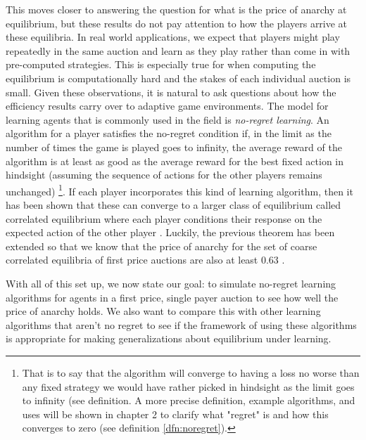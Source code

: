 \documentclass[12pt,twoside]{reedthesis}
\begin{document}
This moves closer to answering the question for what is the price of anarchy at equilibrium, but these results do not pay attention to how the players arrive at these equilibria. In real world applications, we expect that players might play repeatedly in the same auction and learn as they play rather than come in with pre-computed strategies. This is especially true for when computing the equilibrium is computationally hard and the stakes of each individual auction is small. Given these observations, it is natural to ask questions about how the efficiency results carry over to adaptive game environments. The model for learning agents that is commonly used in the field is {\em no-regret learning}. An algorithm for a player satisfies the no-regret condition if, in the limit as the number of times the game is played goes to infinity, the average reward of the algorithm is at least as good as the average reward for the best fixed action in hindsight (assuming the sequence of actions for the other players remains unchanged) \footnote{That is to say that the algorithm will converge to having a loss no worse than any fixed strategy we would have rather picked in hindsight as the limit goes to infinity (see definition. A more precise definition, example algorithms, and uses will be shown in chapter 2 to clarify what "regret" is and how this converges to zero (see definition \ref{dfn:noregret}).}. If each player  incorporates this kind of learning algorithm, then it has been shown that these can converge to a larger class of equilibrium called correlated equilibrium where each player conditions their response on the expected action of the other player \citep{Blum2007}. Luckily, the previous theorem has been extended so that we know that the price of anarchy for the set of coarse correlated equilibria of first price auctions are also at least 0.63 \citep{Roughgarden2017}. 

With all of this set up, we now state our goal: to simulate no-regret learning algorithms for agents in a first price, single payer auction to see how well the price of anarchy holds. We also want to compare this with other learning algorithms that aren't no regret to see if the framework of using these algorithms is appropriate for making generalizations about equilibrium under learning.

	
\end{document}
